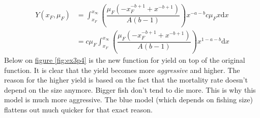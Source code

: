 \documentclass{article}
\numberwithin{equation}{section} %
\newcommand{\md}{\mathrm{d}}
\begin{document}
\begin{equation}\label{yeildExtra}
    \begin{split}
        Y(x_F,\mu_F) &= \int_{x_F}^{x_\infty}\left(\dfrac{\mu_F\left(-x_F^{-b+1}+x^{-b+1}\right)}{A(b-1)}\right)x^{-a-b}c\mu_F x\md x\\
    	&=c\mu_F\int_{x_F}^{x_\infty}\left(\dfrac{\mu_F\left(-x_F^{-b+1}+x^{-b+1}\right)}{A(b-1)}\right)x^{1-a-b}\md x
    \end{split}
\end{equation}
Below on \hyperref[fig:ex3p4]{figure \ref{fig:ex3p4}} is the new function for yield on top of the original function. It is clear that the yield becomes more \textit{aggressive} and higher. The reason for the higher yield is based on the fact that the mortality rate doesn't depend on the size anymore. Bigger fish don't tend to die more. This is why this model is much more aggressive. The blue model (which depends on fishing size) flattens out much quicker for that exact reason. 
\end{document}

